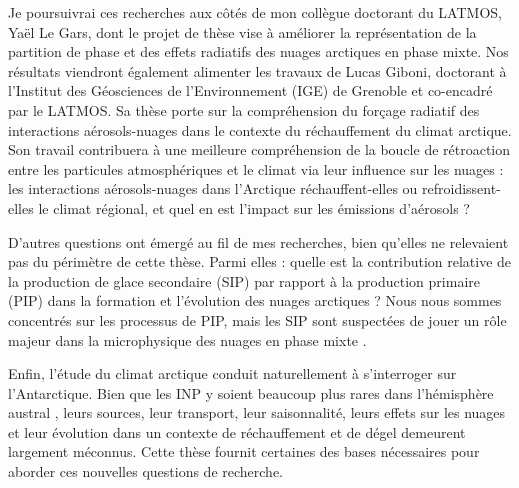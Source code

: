 Je poursuivrai ces recherches aux côtés de mon collègue doctorant du LATMOS, Yaël Le Gars, dont le projet de thèse vise à améliorer la représentation de la partition de phase et des effets radiatifs des nuages arctiques en phase mixte.  
Nos résultats viendront également alimenter les travaux de Lucas Giboni, doctorant à l’Institut des Géosciences de l’Environnement (IGE) de Grenoble et co-encadré par le LATMOS.  
Sa thèse porte sur la compréhension du forçage radiatif des interactions aérosols-nuages dans le contexte du réchauffement du climat arctique.  
Son travail contribuera à une meilleure compréhension de la boucle de rétroaction entre les particules atmosphériques et le climat via leur influence sur les nuages :  
les interactions aérosols-nuages dans l’Arctique réchauffent-elles ou refroidissent-elles le climat régional, et quel en est l’impact sur les émissions d’aérosols ?

D’autres questions ont émergé au fil de mes recherches, bien qu’elles ne relevaient pas du périmètre de cette thèse.  
Parmi elles : quelle est la contribution relative de la production de glace secondaire (SIP) par rapport à la production primaire (PIP) dans la formation et l’évolution des nuages arctiques ?  
Nous nous sommes concentrés sur les processus de PIP, mais les SIP sont suspectées de jouer un rôle majeur dans la microphysique des nuages en phase mixte \citep{sotiropoulou_impact_2020, zhao_global_2021, zhao_primary_2022}.  

Enfin, l’étude du climat arctique conduit naturellement à s’interroger sur l’Antarctique.  
Bien que les INP y soient beaucoup plus rares dans l’hémisphère austral \citep{xu_characteristics_2023}, leurs sources, leur transport, leur saisonnalité, leurs effets sur les nuages et leur évolution dans un contexte de réchauffement et de dégel demeurent largement méconnus.  
Cette thèse fournit certaines des bases nécessaires pour aborder ces nouvelles questions de recherche.


